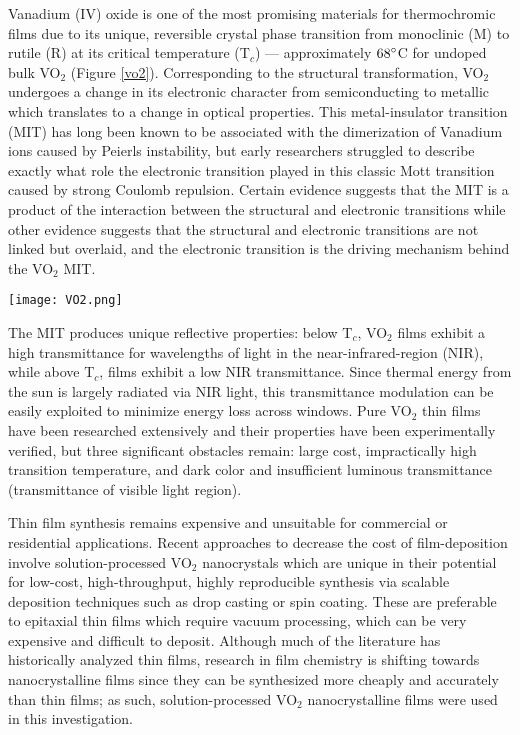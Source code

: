 \documentclass[a4paper]{article}
\begin{document}
Vanadium (IV) oxide is one of the most promising materials for thermochromic films due to its unique, reversible crystal phase transition from monoclinic (M) to rutile (R) at its critical temperature (T$_c$) — approximately $68\degree $C for undoped bulk VO$_2$ (Figure \ref{vo2}). \cite{morin} Corresponding to the structural transformation, VO$_2$ undergoes a change in its electronic character from semiconducting to metallic which translates to a change in optical properties. This metal-insulator transition (MIT) has long been known to be associated with the dimerization of Vanadium ions caused by Peierls instability, but early researchers struggled to describe exactly what role the electronic transition played in this classic Mott transition caused by strong Coulomb repulsion. \cite{qazilbash} Certain evidence suggests that the MIT is a product of the interaction between the structural and electronic transitions while other evidence suggests that the structural and electronic transitions are not linked but overlaid, and the electronic transition is the driving mechanism behind the VO$_2$ MIT. \cite{driscoll}

\begin{figure*}[t]
    \centering
    \texttt{[image: VO2.png]}
    \caption{\textbf{VO$_2$ Crystal Morphology} \cite{siwick}}
    \label{vo2}
\end{figure*}

The MIT produces unique reflective properties: below T$_c$, VO$_2$ films exhibit a high transmittance for wavelengths of light in the near-infrared-region (NIR), while above T$_c$, films exhibit a low NIR transmittance. Since thermal energy from the sun is largely radiated via NIR light, this transmittance modulation can be easily exploited to minimize energy loss across windows. Pure VO$_2$ thin films have been researched extensively and their properties have been experimentally verified, but three significant obstacles remain: large cost, impractically high transition temperature, and dark color and insufficient luminous transmittance (transmittance of visible light region). \cite{li}

Thin film synthesis remains expensive and unsuitable for commercial or residential applications. Recent approaches to decrease the cost of film-deposition involve solution-processed VO$_2$ nanocrystals which are unique in their potential for low-cost, high-throughput, highly reproducible synthesis via scalable deposition techniques such as drop casting or spin coating. \cite{paik} These are preferable to epitaxial thin films which require vacuum processing, which can be very expensive and difficult to deposit. Although much of the literature has historically analyzed thin films, research in film chemistry is shifting towards nanocrystalline films since they can be synthesized more cheaply and accurately than thin films; as such, solution-processed VO$_2$ nanocrystalline films were used in this investigation.
\end{document}
